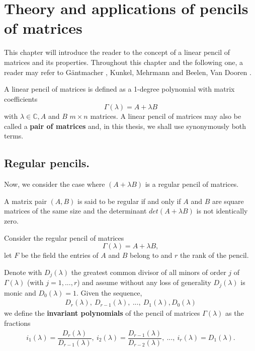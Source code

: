 \section{Theory and applications of pencils of matrices}
This chapter will introduce the reader to the concept of a linear pencil of matrices and its properties. Throughout this
chapter and the following one, a reader may refer to G\"antmacher \cite{gantmacher}, Kunkel, Mehrmann
\cite{kunkel-mehrmann} and Beelen, Van Dooren \cite{beelen-van_dooren}.
\begin{definition}
    A linear pencil of matrices is defined as a 1-degree polynomial with matrix coefficients
    \[
        \Gamma(\lambda) = A + \lambda B
    \]
    with \(\lambda \in \mathbb{C}, A\) and \(B\) \(m \times n\) matrices.
    A linear pencil of matrices may also be called a \textbf{pair of matrices} and, in this thesis, we shall use
    synonymously both terms.
\end{definition}

\subsection*{Regular pencils.}
Now, we consider the case where \((A + \lambda B)\) is a regular pencil of matrices.
\begin{definition}\cite[p. 25, Definition 2]{gantmacher}
    A matrix pair \((A, B)\) is said to be regular if and only if \(A\) and \(B\) are square matrices of the same size and
    the determinant \(det(A + \lambda B)\) is not identically zero.
\end{definition}

Consider the regular pencil of matrices
\[\Gamma(\lambda) = A + \lambda B,\]
let \(F\) be the field the entries of \(A\) and \(B\) belong to and \(r\) the rank of the pencil.

Denote with \(D_{j}(\lambda)\) the greatest common divisor of all minors of order \(j\) of \(\Gamma(\lambda)\)
(with \(j = 1, ..., r\)) and assume without any loss of generality \(D_{j}(\lambda)\) is monic and
\(D_{0}(\lambda) = 1\). Given the sequence,
\begin{gather*}
    D_{r}(\lambda), \
    D_{r-1}(\lambda), \
    ..., \
    D_{1}(\lambda), D_{0}(\lambda)
\end{gather*}
we define the \textbf{invariant polynomials} \cite[p. 26]{gantmacher} of the pencil of matrices
\(\Gamma(\lambda)\) as the fractions
\begin{gather*}
    i_{1}(\lambda) = \dfrac{D_{r}(\lambda)}{D_{r-1}(\lambda)}, \
    i_{2}(\lambda) = \dfrac{D_{r-1}(\lambda)}{D_{r-2}(\lambda)}, \
    ..., \
    i_{r}(\lambda) = D_{1}(\lambda).
\end{gather*}

